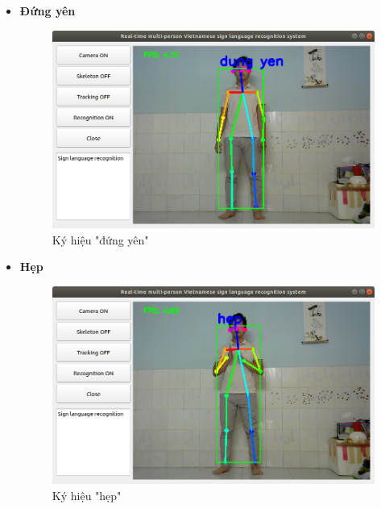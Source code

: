 \documentclass[12pt,a4paper,oneside]{book}
\numberwithin{equation}{chapter} %
\numberwithin{figure}{chapter} %
\numberwithin{table}{chapter} %
\begin{document}
\begin{itemize}
\item \textbf{Đứng yên}
\FloatBarrier
\begin{figure}[htp]
\begin{center}
\includegraphics[scale=0.4]{kq/dung_yen.png}
\end{center}
\caption{Ký hiệu "đứng yên"}
\end{figure}
\FloatBarrier

\thispagestyle{phuluc}
\pagebreak
\item \textbf{Hẹp}
\FloatBarrier
\begin{figure}[htp]
\begin{center}
\includegraphics[scale=0.4]{kq/hep.png}
\end{center}
\caption{Ký hiệu "hẹp"}
\end{figure}
\FloatBarrier


\end{itemize}
\end{document}
